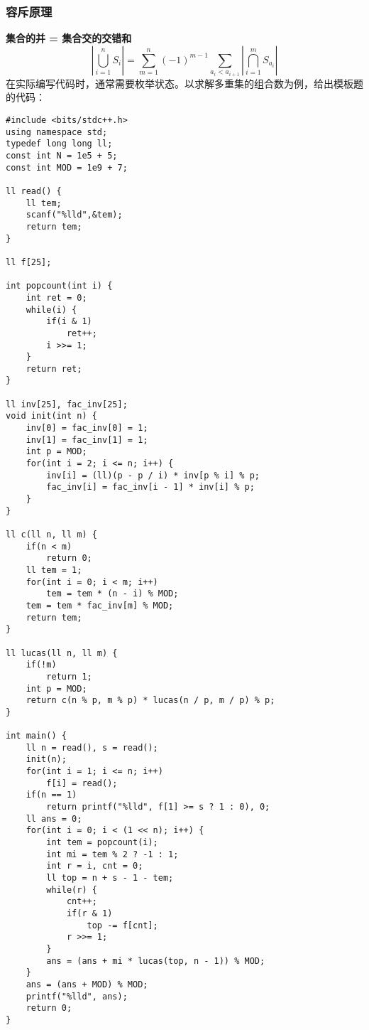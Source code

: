 \documentclass[UTF8]{article}
\begin{document}
\subsubsection{容斥原理}
\noindent \textbf{集合的并 = 集合交的交错和}
$$
\left|\bigcup_{i=1}^n S_i\right|=\sum_{m=1}^n(-1)^{m-1} \sum_{a_i<a_{i+1}}\left|\bigcap_{i=1}^m S_{a_i}\right|
$$
在实际编写代码时，通常需要枚举状态。以求解多重集的组合数为例，给出模板题的代码：
\begin{lstlisting}[caption=容斥原理示例 - 多重集组合数]
#include <bits/stdc++.h>
using namespace std;
typedef long long ll;
const int N = 1e5 + 5;
const int MOD = 1e9 + 7;

ll read() {
    ll tem;
    scanf("%lld",&tem);
    return tem;
}

ll f[25];

int popcount(int i) {
    int ret = 0;
    while(i) {
        if(i & 1)
            ret++;
        i >>= 1;
    }
    return ret;
}

ll inv[25], fac_inv[25];
void init(int n) {
    inv[0] = fac_inv[0] = 1;
    inv[1] = fac_inv[1] = 1;
    int p = MOD;
    for(int i = 2; i <= n; i++) {
        inv[i] = (ll)(p - p / i) * inv[p % i] % p;
        fac_inv[i] = fac_inv[i - 1] * inv[i] % p;
    }
}

ll c(ll n, ll m) {
    if(n < m)
        return 0;
    ll tem = 1;
    for(int i = 0; i < m; i++)
        tem = tem * (n - i) % MOD;
    tem = tem * fac_inv[m] % MOD;
    return tem;
}

ll lucas(ll n, ll m) {
    if(!m)
        return 1;
    int p = MOD;
    return c(n % p, m % p) * lucas(n / p, m / p) % p;
}

int main() {
    ll n = read(), s = read();
    init(n);
    for(int i = 1; i <= n; i++)
        f[i] = read();
    if(n == 1) 
        return printf("%lld", f[1] >= s ? 1 : 0), 0;
    ll ans = 0;
    for(int i = 0; i < (1 << n); i++) {
        int tem = popcount(i);
        int mi = tem % 2 ? -1 : 1;
        int r = i, cnt = 0;
        ll top = n + s - 1 - tem;
        while(r) {
            cnt++;
            if(r & 1)
                top -= f[cnt];
            r >>= 1;
        }
        ans = (ans + mi * lucas(top, n - 1)) % MOD;
    }
    ans = (ans + MOD) % MOD;
    printf("%lld", ans);
    return 0;
}
\end{lstlisting}
\end{document}

